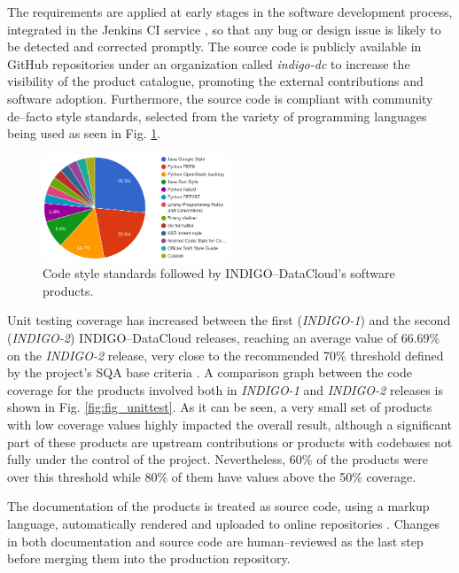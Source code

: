 \documentclass[journal]{IEEEtran}
\begin{document}
The requirements are applied at early stages in the software development
process, integrated in the Jenkins CI service \cite{indigo-jenkins}, so that any
bug or design issue is likely to be detected and corrected promptly. The source
code is publicly available in GitHub repositories under an organization called
{\sl indigo-dc} \cite{indigo-github} to increase the visibility of the product
catalogue, promoting the external contributions and software adoption. Furthermore,
the source code is compliant with community de--facto style standards,
selected from the variety of programming languages being used as seen in
Fig. \ref{fig:fig_codestyle}.

\begin{figure}[!t]
\centering
\includegraphics[width=0.5\textwidth]{images/codestyle.png}
\caption{Code style standards followed by INDIGO--DataCloud's software products.}
\label{fig:fig_codestyle}
\end{figure}

Unit testing coverage has increased between the first ({\sl INDIGO-1}) and the
second ({\sl INDIGO-2}) INDIGO--DataCloud releases, reaching an average value of
66.69\% on the {\sl INDIGO-2} release, very close to the recommended 70\% threshold
defined by the project’s SQA base criteria \cite{indigo-d31}. A comparison graph
between the code coverage for the products involved both in {\sl INDIGO-1} and
{\sl INDIGO-2} releases is shown in Fig. \ref{fig:fig_unittest}. As it can be seen,
a very small set of products with low coverage values highly impacted the overall
result, although a significant part of these products are upstream contributions
or products with codebases not fully under the control of the project. Nevertheless,
60\% of the products were over this threshold while 80\% of them have values above
the 50\% coverage.

The documentation of the products is treated as source code, using a markup
language, automatically rendered and uploaded to online repositories
\cite{indigo-gitbook}. Changes in both documentation and source code are
human--reviewed as the last step before merging them into the production
repository.
\end{document}
